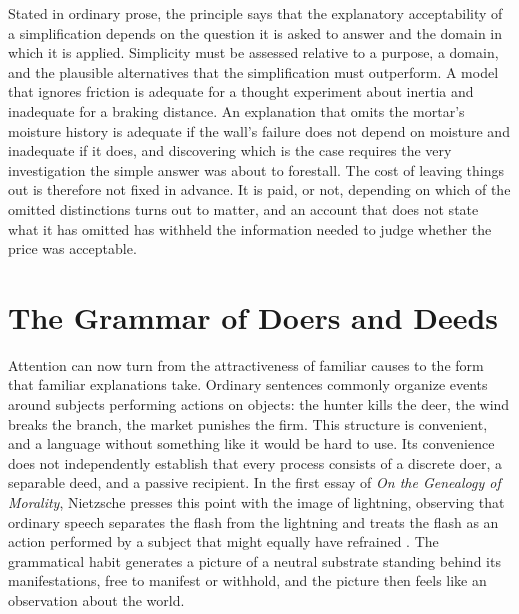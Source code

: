 \documentclass[11pt,letterpaper]{article}
\theoremstyle{definition}
\begin{document}
Stated in ordinary prose, the principle says that the explanatory acceptability of a simplification depends on the question it is asked to answer and the domain in which it is applied. Simplicity must be assessed relative to a purpose, a domain, and the plausible alternatives that the simplification must outperform. A model that ignores friction is adequate for a thought experiment about inertia and inadequate for a braking distance. An explanation that omits the mortar's moisture history is adequate if the wall's failure does not depend on moisture and inadequate if it does, and discovering which is the case requires the very investigation the simple answer was about to forestall. The cost of leaving things out is therefore not fixed in advance. It is paid, or not, depending on which of the omitted distinctions turns out to matter, and an account that does not state what it has omitted has withheld the information needed to judge whether the price was acceptable.

\section{The Grammar of Doers and Deeds}

Attention can now turn from the attractiveness of familiar causes to the form that familiar explanations take. Ordinary sentences commonly organize events around subjects performing actions on objects: the hunter kills the deer, the wind breaks the branch, the market punishes the firm. This structure is convenient, and a language without something like it would be hard to use. Its convenience does not independently establish that every process consists of a discrete doer, a separable deed, and a passive recipient. In the first essay of \emph{On the Genealogy of Morality}, Nietzsche presses this point with the image of lightning, observing that ordinary speech separates the flash from the lightning and treats the flash as an action performed by a subject that might equally have refrained \cite{nietzsche-gm}. The grammatical habit generates a picture of a neutral substrate standing behind its manifestations, free to manifest or withhold, and the picture then feels like an observation about the world.
\end{document}
